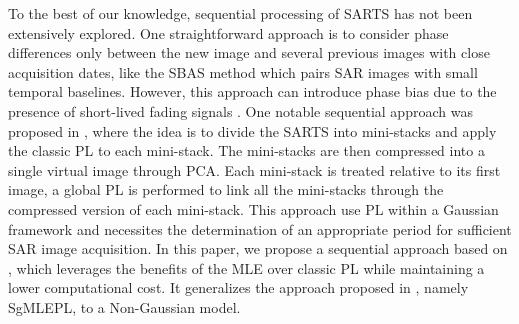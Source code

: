     \noindent
    To the best of our knowledge, sequential processing of \acs{SARTS} has not been extensively explored. One straightforward approach is to consider phase differences only between the new image and several previous images with close acquisition dates, like the \ac{SBAS} method \citep{lanari2004small} which pairs \ac{SAR} images with small temporal baselines.
    However, this approach can introduce phase bias due to the presence of short-lived fading signals \citep{ansari2020study}.
    One notable sequential approach was proposed in \citep{ansari2017sequential}, where the idea is to divide the \acs{SARTS} into mini-stacks and apply the classic \acs{PL} to each mini-stack. The mini-stacks are then compressed into a single virtual image through \ac{PCA}. Each mini-stack is treated relative to its first image, a global \acs{PL} is performed to link all the mini-stacks through the compressed version of each mini-stack. %
    This approach use \acs{PL} within a Gaussian framework and necessites the determination of an appropriate period for sufficient \acs{SAR} image acquisition.
    In this paper, we propose a sequential approach based on \citep{vu2023robust}, which leverages the benefits of the \acs{MLE} over classic \acs{PL} while maintaining a lower computational cost. It generalizes the approach proposed in \citep{elhajjar2024}, namely \ac{SgMLEPL}, to a Non-Gaussian model. 
    
    
